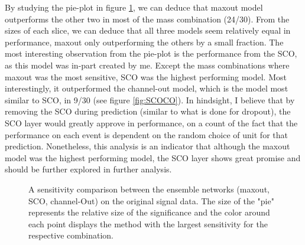 By studying the pie-plot in figure \ref{fig:EnsembleComp}, we can deduce that maxout model outperforms the other two in most of the mass 
combination (24/30). From the sizes of each slice, we can deduce that all three models seem relatively equal in performance, maxout only 
outperforming the others by a small fraction. The most interesting observation from the pie-plot is the performance from the \ac{SCO}, as 
this model was in-part created by me. Except the mass combinations where maxout was the most sensitive, \ac{SCO} was the highest performing model. 
Most interestingly, it outperformed the channel-out model, which is the model most similar to \ac{SCO}, in 9/30 (see figure \ref{fig:SCOCO}). 
In hindsight, I believe that by removing the \ac{SCO} during prediction (similar to what is done for dropout), the \ac{SCO} layer would greatly 
approve in performance, on a count of the fact that the performance on each event is dependent on the random choice of unit for that prediction.
Nonetheless, this analysis is an indicator that although the maxout model was the highest performing model, the \ac{SCO} layer shows 
great promise and should be further explored in further analysis. 
\begin{figure}
    \caption[A sensitivity comparison between the ensemble networks (maxout, \ac{SCO}, channel-Out) on the original 
    signal data.]{A sensitivity comparison between the ensemble networks (maxout, \ac{SCO}, channel-Out) on the original 
    signal data. The size of the "pie" represents the relative size of the significance and the color around each 
    point displays the method with the largest sensitivity for the respective combination.}
    \label{fig:EnsembleComp}
\end{figure}

